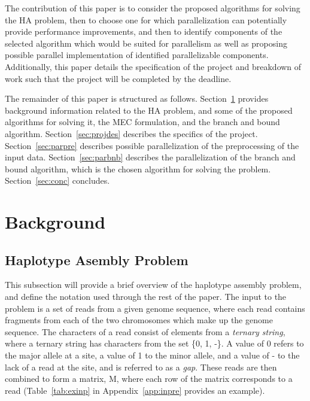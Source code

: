 \documentclass[10pt,a4paer,twocolumn]{article}
\begin{document}
The contribution of this paper is to consider the proposed algorithms for solving the HA problem, then to
choose one for which parallelization can potentially provide performance improvements, and then to identify 
components of the selected algorithm which would be suited for parallelism as well as proposing possible 
parallel implementation of identified parallelizable components. Additionally, this paper details the
specification of the project and breakdown of work such that the project will be completed by the deadline.

The remainder of this paper is structured as follows. Section~\ref{sec:bground} provides background
information related to the HA problem, and some of the proposed algorithms for solving it, the MEC
formulation, and the branch and bound algorithm. Section~\ref{sec:projdes} describes the specifics of the
project. Section~\ref{sec:parpre} describes possible parallelization of the preprocessing of the input data. 
Section~\ref{sec:parbnb} describes the parallelization of the branch and bound algorithm, which is the chosen
algorithm for solving the problem. Section~\ref{sec:conc} concludes.


\section{Background} \label{sec:bground}

\subsection{Haplotype Asembly Problem} \label{sec:hap}

This subsection will provide a brief overview of the haplotype assembly problem, and define the
notation used through the rest of the paper. The input to the problem is a set of reads from a given genome
sequence, where each read contains fragments from each of the two chromosomes which make up the genome
sequence. The characters of a read consist of elements from a \textit{ternary string}, where a ternary
string has characters from the set \{0, 1, -\}. A value of 0 refers to the major allele
at a site, a value of 1 to the minor allele, and a value of - to the lack of a read at the site, and is
referred to as a \textit{gap}. These reads are then combined to form a matrix, M, where each row of the 
matrix corresponds to a read (Table~\ref{tab:exinp} in Appendix~\ref{app:inpre} provides an example). 
\end{document}

